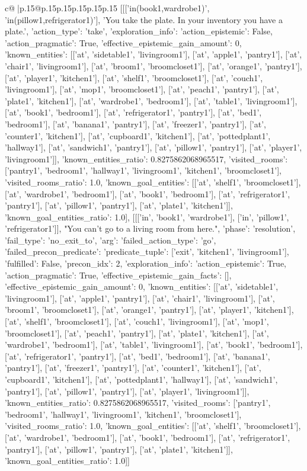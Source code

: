 \documentclass{article}
\begin{document}
{\begin{supertabular}{c@{$\;$}|p{.15\linewidth}@{}p{.15\linewidth}p{.15\linewidth}p{.15\linewidth}p{.15\linewidth}p{.15\linewidth}}
{{{	 [[['in(book1,wardrobe1)', 'in(pillow1,refrigerator1)'], 'You take the plate. In your inventory you have a plate.', {'action_type': 'take', 'exploration_info': {'action_epistemic': False, 'action_pragmatic': True, 'effective_epistemic_gain_amount': 0, 'known_entities': [['at', 'sidetable1', 'livingroom1'], ['at', 'apple1', 'pantry1'], ['at', 'chair1', 'livingroom1'], ['at', 'broom1', 'broomcloset1'], ['at', 'orange1', 'pantry1'], ['at', 'player1', 'kitchen1'], ['at', 'shelf1', 'broomcloset1'], ['at', 'couch1', 'livingroom1'], ['at', 'mop1', 'broomcloset1'], ['at', 'peach1', 'pantry1'], ['at', 'plate1', 'kitchen1'], ['at', 'wardrobe1', 'bedroom1'], ['at', 'table1', 'livingroom1'], ['at', 'book1', 'bedroom1'], ['at', 'refrigerator1', 'pantry1'], ['at', 'bed1', 'bedroom1'], ['at', 'banana1', 'pantry1'], ['at', 'freezer1', 'pantry1'], ['at', 'counter1', 'kitchen1'], ['at', 'cupboard1', 'kitchen1'], ['at', 'pottedplant1', 'hallway1'], ['at', 'sandwich1', 'pantry1'], ['at', 'pillow1', 'pantry1'], ['at', 'player1', 'livingroom1']], 'known_entities_ratio': 0.8275862068965517, 'visited_rooms': ['pantry1', 'bedroom1', 'hallway1', 'livingroom1', 'kitchen1', 'broomcloset1'], 'visited_rooms_ratio': 1.0, 'known_goal_entities': [['at', 'shelf1', 'broomcloset1'], ['at', 'wardrobe1', 'bedroom1'], ['at', 'book1', 'bedroom1'], ['at', 'refrigerator1', 'pantry1'], ['at', 'pillow1', 'pantry1'], ['at', 'plate1', 'kitchen1']], 'known_goal_entities_ratio': 1.0}}], [[['in', 'book1', 'wardrobe1'], ['in', 'pillow1', 'refrigerator1']], "You can't go to a living room from here.", {'phase': 'resolution', 'fail_type': 'no_exit_to', 'arg': {'failed_action_type': 'go', 'failed_precon_predicate': {'predicate_tuple': ['exit', 'kitchen1', 'livingroom1'], 'fulfilled': False, 'precon_idx': 2}}, 'exploration_info': {'action_epistemic': True, 'action_pragmatic': True, 'effective_epistemic_gain_facts': [], 'effective_epistemic_gain_amount': 0, 'known_entities': [['at', 'sidetable1', 'livingroom1'], ['at', 'apple1', 'pantry1'], ['at', 'chair1', 'livingroom1'], ['at', 'broom1', 'broomcloset1'], ['at', 'orange1', 'pantry1'], ['at', 'player1', 'kitchen1'], ['at', 'shelf1', 'broomcloset1'], ['at', 'couch1', 'livingroom1'], ['at', 'mop1', 'broomcloset1'], ['at', 'peach1', 'pantry1'], ['at', 'plate1', 'kitchen1'], ['at', 'wardrobe1', 'bedroom1'], ['at', 'table1', 'livingroom1'], ['at', 'book1', 'bedroom1'], ['at', 'refrigerator1', 'pantry1'], ['at', 'bed1', 'bedroom1'], ['at', 'banana1', 'pantry1'], ['at', 'freezer1', 'pantry1'], ['at', 'counter1', 'kitchen1'], ['at', 'cupboard1', 'kitchen1'], ['at', 'pottedplant1', 'hallway1'], ['at', 'sandwich1', 'pantry1'], ['at', 'pillow1', 'pantry1'], ['at', 'player1', 'livingroom1']], 'known_entities_ratio': 0.8275862068965517, 'visited_rooms': ['pantry1', 'bedroom1', 'hallway1', 'livingroom1', 'kitchen1', 'broomcloset1'], 'visited_rooms_ratio': 1.0, 'known_goal_entities': [['at', 'shelf1', 'broomcloset1'], ['at', 'wardrobe1', 'bedroom1'], ['at', 'book1', 'bedroom1'], ['at', 'refrigerator1', 'pantry1'], ['at', 'pillow1', 'pantry1'], ['at', 'plate1', 'kitchen1']], 'known_goal_entities_ratio': 1.0}}]] 
}}}
\end{supertabular}}
\end{document}
